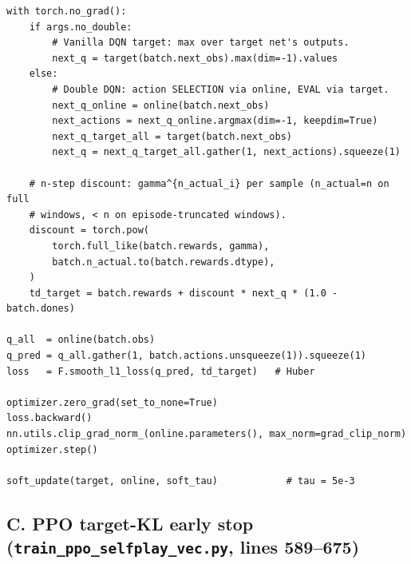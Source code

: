 \begin{lstlisting}
with torch.no_grad():
    if args.no_double:
        # Vanilla DQN target: max over target net's outputs.
        next_q = target(batch.next_obs).max(dim=-1).values
    else:
        # Double DQN: action SELECTION via online, EVAL via target.
        next_q_online = online(batch.next_obs)
        next_actions = next_q_online.argmax(dim=-1, keepdim=True)
        next_q_target_all = target(batch.next_obs)
        next_q = next_q_target_all.gather(1, next_actions).squeeze(1)

    # n-step discount: gamma^{n_actual_i} per sample (n_actual=n on full
    # windows, < n on episode-truncated windows).
    discount = torch.pow(
        torch.full_like(batch.rewards, gamma),
        batch.n_actual.to(batch.rewards.dtype),
    )
    td_target = batch.rewards + discount * next_q * (1.0 - batch.dones)

q_all  = online(batch.obs)
q_pred = q_all.gather(1, batch.actions.unsqueeze(1)).squeeze(1)
loss   = F.smooth_l1_loss(q_pred, td_target)   # Huber

optimizer.zero_grad(set_to_none=True)
loss.backward()
nn.utils.clip_grad_norm_(online.parameters(), max_norm=grad_clip_norm)
optimizer.step()

soft_update(target, online, soft_tau)            # tau = 5e-3
\end{lstlisting}

\subsection*{C. PPO target-KL early stop (\texttt{train\_ppo\_selfplay\_vec.py}, lines 589--675)}

